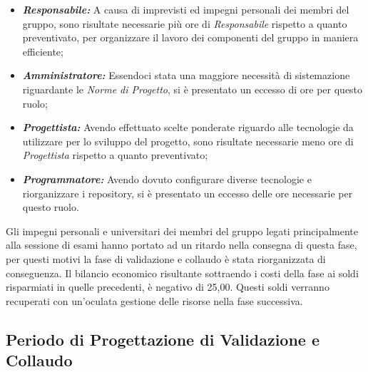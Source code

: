 \begin{itemize}
    \item \textbf{\textit{Responsabile:}} A causa di imprevisti ed impegni personali dei membri del gruppo, sono risultate necessarie più ore di \textit{Responsabile} rispetto a quanto preventivato, per organizzare il lavoro dei componenti del gruppo in maniera efficiente;
    \item \textbf{\textit{Amministratore:}} Essendoci stata una maggiore necessità di sistemazione riguardante le \textit{Norme di Progetto}, si è presentato un eccesso di ore per questo ruolo;
    \item \textbf{\textit{Progettista:}} Avendo effettuato scelte ponderate riguardo alle tecnologie da utilizzare per lo sviluppo del progetto, sono risultate necessarie meno ore di \textit{Progettista} rispetto a quanto preventivato;
    \item \textbf{\textit{Programmatore:}} Avendo dovuto configurare diverse tecnologie e riorganizzare i repository, si è presentato un eccesso delle ore necessarie per questo ruolo.
\end{itemize}
Gli impegni personali e universitari dei membri del gruppo legati principalmente alla sessione di esami hanno portato ad un ritardo nella consegna di questa fase, per questi motivi la fase di validazione e collaudo è stata riorganizzata di conseguenza.
Il bilancio economico risultante sottraendo i costi della fase ai soldi risparmiati in quelle precedenti, è negativo di 25,00\EURdig. Questi soldi verranno recuperati con un'oculata gestione delle risorse nella fase successiva.
\pagebreak

\subsection{Periodo di Progettazione di Validazione e Collaudo}
